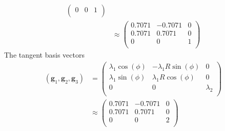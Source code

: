 \documentclass[../main.tex]{subfiles}
\begin{document}
\begin{minipage}[t]{0.5\textwidth}
\begin{align*}
\begin{pmatrix}
                                                            0 & 0 & 1\\
                                                          \end{pmatrix}\\
                                                        &\approx
                                                          \begin{pmatrix}
                                                            0.7071 & -0.7071 & 0\\
                                                            0.7071 &  0.7071 & 0\\
                                                            0	& 0 & 1\\
                                                          \end{pmatrix}
  \end{align*}
  The tangent basis vectors
  \begin{align*}
    \left(\mathbf{g}_1,\mathbf{g}_2,\mathbf{g}_3\right) &=
                                                          \begin{pmatrix}
                                                            \lambda_1\cos(\phi) & -\lambda_1R\sin(\phi) & 0\\
                                                            \lambda_1\sin(\phi) &  \lambda_1R\cos(\phi) & 0\\
                                                            0 & 0 & \lambda_2\\
                                                          \end{pmatrix}\\
                                                        &\approx
                                                          \begin{pmatrix}
                                                            0.7071 & -0.7071 & 0\\
                                                            0.7071 &  0.7071 & 0\\
                                                            0 & 0 & 2\\
                                                          \end{pmatrix}
  \end{align*}

\end{minipage}
\end{document}
